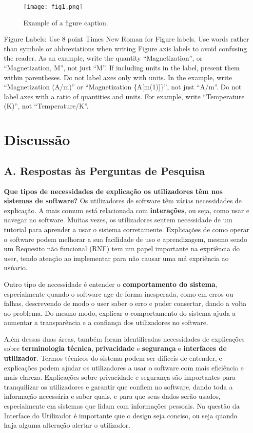 \documentclass[conference]{IEEEtran}
\begin{document}
\begin{figure}[htbp]
\centerline{\texttt{[image: fig1.png]}}
\caption{Example of a figure caption.}
\label{fig}
\end{figure}

Figure Labels: Use 8 point Times New Roman for Figure labels. Use words 
rather than symbols or abbreviations when writing Figure axis labels to 
avoid confusing the reader. As an example, write the quantity 
``Magnetization'', or ``Magnetization, M'', not just ``M''. If including 
units in the label, present them within parentheses. Do not label axes only 
with units. In the example, write ``Magnetization (A/m)'' or ``Magnetization 
\{A[m(1)]\}'', not just ``A/m''. Do not label axes with a ratio of 
quantities and units. For example, write ``Temperature (K)'', not 
``Temperature/K''.

\section*{Discussão}

\subsection*{A. Respostas às Perguntas de Pesquisa}

\textbf{Que tipos de necessidades de explicação os utilizadores têm nos sistemas de software?}
Os utilizadores de software têm várias necessidades de explicação. A mais comum está relacionada com \textbf{interações}, ou seja, como usar e navegar no software. Muitas vezes, os utilizadores sentem necessidade de um tutorial para aprender a usar o sistema corretamente. Explicações de como operar o software podem melhorar a sua facilidade de uso e aprendizagem, mesmo sendo um Requesito não funcional (RNF) tem um papel importante na expriência do user, tendo atenção ao implementar para não causar uma má expriência ao usúario.

Outro tipo de necessidade é entender o \textbf{comportamento do sistema}, especialmente quando o software age de forma inesperada, como em erros ou falhas, descrevendo de modo o user saber o erro e puder consertar, dando a volta ao problema. Do mesmo modo, explicar o comportamento do sistema ajuda a aumentar a transparência e a confiança dos utilizadores no software.

Além dessas duas áreas, também foram identificadas necessidades de explicações sobre \textbf{terminologia técnica}, \textbf{privacidade} e \textbf{segurança} e \textbf{interfaces de utilizador}. Termos técnicos do sistema podem ser difíceis de entender, e explicações podem ajudar os utilizadores a usar o software com mais eficiência e mais clareza. Explicações sobre privacidade e segurança são importantes para tranquilizar os utilizadores e garantir que confiem no software, dando toda a informação necessária e saber quais, e para que seus dados serão usados, especialmente em sistemas que lidam com informações pessoais. Na questão da Interface do Utilizador é importante que o design seja conciso, ou seja quando haja alguma alteração alertar o utilizador.
\end{document}
